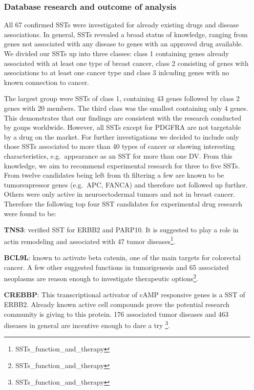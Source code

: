 \documentclass[]{article}
\let\rmarkdownfootnote\footnote%
\def\footnote{\protect\rmarkdownfootnote}
\begin{document}
\hypertarget{database-research-and-outcome-of-analysis}{%
\subsubsection{Database research and outcome of
analysis}\label{database-research-and-outcome-of-analysis}}

All 67 confirmed SSTs were investigated for already existing drugs and
disease associations. In general, SSTs revealed a broad status of
knowledge, ranging from genes not associated with any disease to genes
with an approved drug available. We divided our SSTs up into three
classes: class 1 containing genes already associated with at least one
type of breast cancer, class 2 consisting of genes with associations to
at least one cancer type and class 3 inlcuding genes with no known
connection to cancer.

The largest group were SSTs of class 1, containing 43 genes followed by
class 2 genes with 20 members. The third class was the smallest
containing only 4 genes. This demonstrates that our findings are
consistent with the research conducted by goups worldwide. However, all
SSTs except for PDGFRA are not targetable by a drug on the market. For
further investigations we decided to include only those SSTs associated
to more than 40 types of cancer or showing interesting characteristics,
e.g.~appearance as an SST for more than one DV. From this knowledge, we
aim to recommend experimental research for three to five SSTs. From
twelve candidates being left from th filtering a few are known to be
tumorsupressor genes (e.g.~APC, FANCA) and therefore not followed up
further. Others were only active in neuroectodermal tumors and not in
breast cancer. Therefore the following top four SST candidates for
experimental drug research were found to be:

\textbf{TNS3}: verified SST for ERBB2 and PARP10. It is suggested to
play a role in actin remodeling and associated with 47 tumor
diseases\footnote{SSTs\_function\_and\_therapy}.

\textbf{BCL9L}: known to activate beta catenin, one of the main targets
for colorectal cancer. A few other suggested functions in tumorigenesis
and 65 associated neoplasms are reason enough to investigate therapeutic
options\footnote{SSTs\_function\_and\_therapy}.

\textbf{CREBBP}: This transcriptional activator of cAMP responsive genes
is a SST of ERBB2. Already known active cell compounds prove the
potential research community is giving to this protein. 176 associated
tumor diseases and 463 diseases in general are incentive enough to dare
a try \footnote{SSTs\_function\_and\_therapy}.
\end{document}
